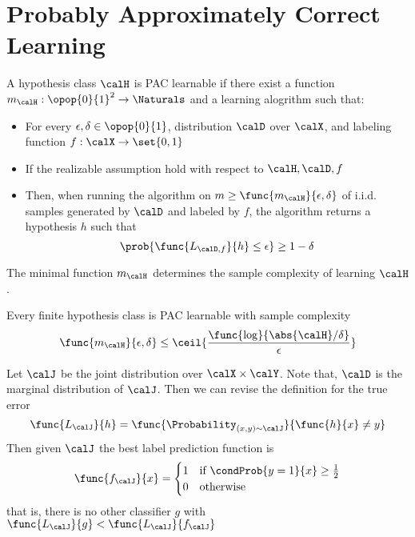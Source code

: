 
\chapter{Probably Approximately Correct Learning}

\begin{definition}
    A hypothesis class \(\calH\) is PAC learnable if there exist a function \(m_{\calH} : \opop{0}{1}^2 \to \Naturals\) and a learning alogrithm such that:
    \begin{itemize}
        \item For every \(\epsilon,\delta \in \opop{0}{1}\), distribution \(\calD\) over \(\calX\), and labeling function \(f: \calX \to \set{0,1}\)
        \item If the realizable assumption hold with respect to \(\calH,\calD,f\)
        \item Then, when running the algorithm on \(m \geq \func{m_{\calH}}{\epsilon,\delta}\) of i.i.d. samples generated by \(\calD\) and labeled by \(f\), the algorithm returns a hypothesis \(h\) such that 
        \begin{equation*}
            \prob{\func{L_{\calD, f}}{h} \leq \epsilon} \geq 1- \delta
        \end{equation*}
    \end{itemize}
\end{definition}
\begin{remark}
    The minimal function \(m_{\calH}\) determines the sample complexity of learning \(\calH\).
\end{remark}

\begin{corollary}
    Every finite hypothesis class is PAC learnable with sample complexity 
    \begin{equation*}
        \func{m_{\calH}}{\epsilon, \delta} \leq \ceil{\frac{\func{\log}{\abs{\calH}/\delta }}{\epsilon}}
    \end{equation*}
\end{corollary}

Let \(\calJ\) be the joint distribution over \(\calX \times \calY\). Note that, \(\calD\) is the marginal distribution of \(\calJ\). Then we can revise the definition for the true error 
\begin{equation*}
    \func{L_{\calJ}}{h} = \func{\Probability_{(x,y) \sim \calJ}}{\func{h}{x} \neq y}
\end{equation*}
Then given \(\calJ\) the best label prediction function is 
\begin{equation*}
    \func{f_{\calJ}}{x} = \begin{cases}
        1 & \text{if} \ \condProb{y = 1}{x} \geq \frac{1}{2}\\
        0 & \text{otherwise}
    \end{cases}
\end{equation*}
that is, there is no other classifier \(g\) with \(\func{L_{\calJ}}{g} < \func{L_{\calJ}}{f_{\calJ}}\)

